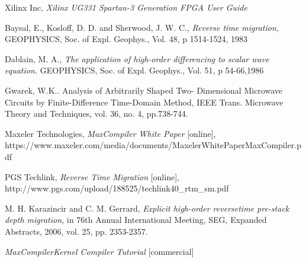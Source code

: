 \begin{thebibliography}{9}
    Xilinx Inc,
    \emph{Xilinx UG331 Spartan-3 Generation FPGA User Guide}

   Baysal, E., Kosloff, D. D. and Sherwood, J. W. C.,
    \emph{Reverse time migration}, GEOPHYSICS, Soc. of Expl.
    Geophys., Vol. 48, p 1514-1524, 1983

  Dablain, M. A.,
    \emph{The application of high-order
    differencing to scalar wave equation.} GEOPHYSICS, Soc. of
    Expl. Geophys., Vol. 51, p 54-66,1986

   Gwarek, W.K.. {Analysis of Arbitrarily Shaped Two-
      Dimensional Microwave Circuits by Finite-Difference
    Time-Domain Method,}
    IEEE Trans. Microwave Theory and Techniques, vol. 36, no. 4, pp.738-744.

    Maxeler Technologies,
    \emph{MaxCompiler White Paper} [online],
    https://www.maxeler.com/media/documents/MaxelerWhitePaperMaxCompiler.pdf

    PGS Techlink,
    \emph{Reverse Time Migration} [online],
    http://www.pgs.com/upload/188525/techlink40\_rtm\_sm.pdf

    M. H. Karazincir and C. M. Gerrard,
    \emph{Explicit high-order reversetime pre-stack depth migration,}
    in 76th Annual International Meeting, SEG, Expanded Abstracts, 2006,
    vol. 25, pp. 2353-2357.

    \emph{MaxCompilerKernel Compiler Tutorial} [commercial]

\end{thebibliography}
